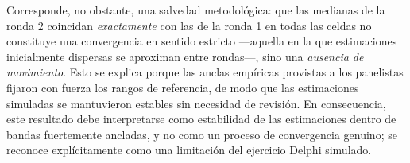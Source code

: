 Corresponde, no obstante, una salvedad metodológica: que las medianas de la ronda 2 coincidan \emph{exactamente} con las de la ronda 1 en todas las celdas no constituye una convergencia en sentido estricto —aquella en la que estimaciones inicialmente dispersas se aproximan entre rondas—, sino una \emph{ausencia de movimiento}. Esto se explica porque las anclas empíricas provistas a los panelistas fijaron con fuerza los rangos de referencia, de modo que las estimaciones simuladas se mantuvieron estables sin necesidad de revisión. En consecuencia, este resultado debe interpretarse como estabilidad de las estimaciones dentro de bandas fuertemente ancladas, y no como un proceso de convergencia genuino; se reconoce explícitamente como una limitación del ejercicio Delphi simulado.

